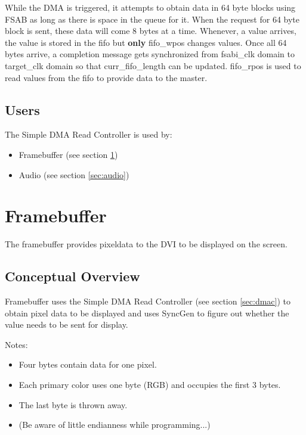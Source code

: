 \documentclass[10pt]{report}
\begin{document}
While the DMA is triggered, it attempts to obtain data in 64 byte blocks
using FSAB as long as there is space in the queue for it. When the request
for 64 byte block is sent, these data will come 8 bytes at a time. Whenever,
a value arrives, the value is stored in the fifo but \textbf{only} fifo\_wpos changes
values. Once all 64 bytes arrive, a completion message gets synchronized
from fsabi\_clk domain to target\_clk domain so that curr\_fifo\_length can be
updated. fifo\_rpos is used to read values from the fifo to provide data to
the master.

\subsection{Users}

The Simple DMA Read Controller is used by:

\begin{itemize}
\item{Framebuffer (see section \ref{sec:framebuffer})}
\item{Audio (see section \ref{sec:audio})}
\end{itemize}

\section{Framebuffer}
\label{sec:framebuffer}

The framebuffer provides pixeldata to the DVI to be displayed on the screen.

\subsection{Conceptual Overview}

Framebuffer uses the Simple DMA Read Controller (see section \ref{sec:dmac})
to obtain pixel data to be displayed and uses SyncGen to figure out whether
the value needs to be sent for display.

Notes:

\begin{itemize}
\item{Four bytes contain data for one pixel.}
\item{Each primary color uses one byte (RGB) and occupies the first 3
bytes.}
\item{The last byte is thrown away.}
\item{(Be aware of little endianness while programming...)}
\end{itemize}
\end{document}
